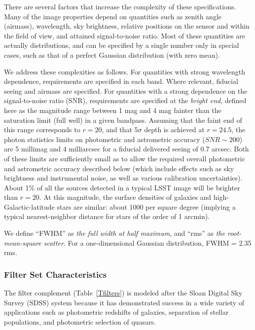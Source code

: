 There are several factors that increase the complexity of these
specifications. Many of the image properties depend on quantities such
as zenith angle (airmass), wavelength, sky brightness, relative positions
on the sensor and within the field of view, and attained signal-to-noise
ratio.  Most of these quantities are actually distributions, and can be
specified by a single number only in special cases, such as that of a
perfect Gaussian distribution (with zero mean).

We address these complexities as follows. For quantities with strong
wavelength dependence, requirements are specified in each band. Where
relevant, fiducial seeing and airmass are specified. For quantities with a
strong dependence on the signal-to-noise ratio (SNR), requirements are
specified at the \textit{bright end}, defined here as the magnitude range
between 1 mag and 4 mag fainter than the saturation limit (full well) in a given
bandpass.  Assuming that the faint end of this range corresponds to $r=20$,
and that 5$\sigma$ depth is achieved at $r=24.5$, the photon statistics
limits on photometric and astrometric accuracy ($SNR\sim200$) are 5 millimag
and 4 milliarcsec for a fiducial delivered seeing of 0.7 arcsec. Both of these
limits are sufficiently small as to allow the required overall photometric
and astrometric accuracy described below (which include effects such as sky
brightness and instrumental noise, as well as various calibration
uncertainties).  About 1\% of all the sources detected in a typical LSST
image will be brighter than $r=20$. At this magnitude, the surface
densities of galaxies and high-Galactic-latitude stars are similar: about
1000 per square degree (implying a typical nearest-neighbor distance for
stars of the order of 1 arcmin).

We define ``FWHM'' as \textit{the full width at half maximum}, and ``rms'' as
\textit{the root-mean-square scatter}. For a one-dimensional Gaussian distribution,
FWHM = 2.35\,rms.


\subsubsection{Filter Set Characteristics}

The filter complement (Table~\ref{Tfilters}) is modeled after the Sloan
Digital Sky Survey (SDSS) system because it has demonstrated success in a
wide variety of applications such as photometric redshifts of galaxies,
separation of stellar populations, and photometric selection of quasars.

